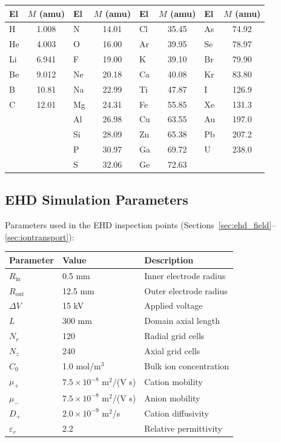 \documentclass[11pt,a4paper]{article}
\begin{document}
\begin{center}
\small
\begin{tabular}{lc|lc|lc|lc}
\toprule
\textbf{El} & \textbf{$M$ (amu)} & \textbf{El} & \textbf{$M$ (amu)}
& \textbf{El} & \textbf{$M$ (amu)} & \textbf{El} & \textbf{$M$ (amu)} \\
\midrule
H  & 1.008  & N  & 14.01  & Cl & 35.45  & As & 74.92 \\
He & 4.003  & O  & 16.00  & Ar & 39.95  & Se & 78.97 \\
Li & 6.941  & F  & 19.00  & K  & 39.10  & Br & 79.90 \\
Be & 9.012  & Ne & 20.18  & Ca & 40.08  & Kr & 83.80 \\
B  & 10.81  & Na & 22.99  & Ti & 47.87  & I  & 126.9 \\
C  & 12.01  & Mg & 24.31  & Fe & 55.85  & Xe & 131.3 \\
   &        & Al & 26.98  & Cu & 63.55  & Au & 197.0 \\
   &        & Si & 28.09  & Zn & 65.38  & Pb & 207.2 \\
   &        & P  & 30.97  & Ga & 69.72  & U  & 238.0 \\
   &        & S  & 32.06  & Ge & 72.63  &    &       \\
\bottomrule
\end{tabular}
\end{center}

\subsection{EHD Simulation Parameters}

Parameters used in the EHD inspection points
(Sections~\ref{sec:ehd_field}--\ref{sec:iontransport}):

\begin{center}
\begin{tabular}{lll}
\toprule
\textbf{Parameter} & \textbf{Value} & \textbf{Description} \\
\midrule
$R_{\text{in}}$    & 0.5 mm        & Inner electrode radius \\
$R_{\text{out}}$   & 12.5 mm       & Outer electrode radius \\
$\Delta V$         & 15 kV         & Applied voltage \\
$L$                & 300 mm        & Domain axial length \\
$N_r$              & 120           & Radial grid cells \\
$N_z$              & 240           & Axial grid cells \\
$C_0$              & 1.0 mol/m$^3$ & Bulk ion concentration \\
$\mu_+$            & $7.5 \times 10^{-8}$ m$^2$/(V s) & Cation mobility \\
$\mu_-$            & $7.5 \times 10^{-8}$ m$^2$/(V s) & Anion mobility \\
$D_+$              & $2.0 \times 10^{-9}$ m$^2$/s & Cation diffusivity \\
$\varepsilon_r$    & 2.2           & Relative permittivity \\
\bottomrule
\end{tabular}
\end{center}
\end{document}
